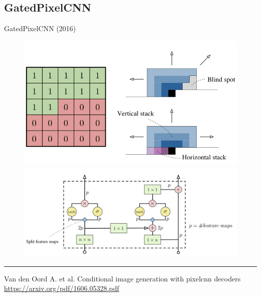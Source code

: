 \documentclass{beamer}
\begin{document}
\subsection{GatedPixelCNN}
\begin{frame}{GatedPixelCNN (2016)}
\begin{figure}
	\centering
	\includegraphics[width=0.5\linewidth]{figs/gatedpixelcnn.png}
	\includegraphics[width=0.5\linewidth]{figs/gated_block.png}
\end{figure}
\vfill
\hrule\medskip
{\scriptsize Van den Oord A. et al. Conditional image generation with pixelcnn decoders \href{https://arxiv.org/pdf/1606.05328.pdf}{https://arxiv.org/pdf/1606.05328.pdf}}
\end{frame}
\end{document}
